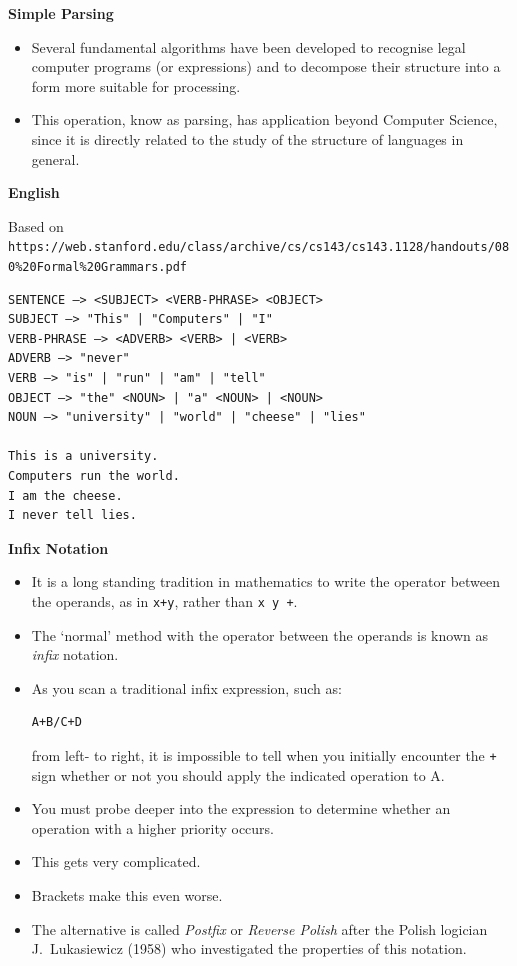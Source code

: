 \newpage
{\samepage
\begin{center}
{\Large{\bf Simple Parsing}}
\end{center}
\begin{itemize}
\item Several fundamental algorithms have been developed
to recognise legal computer programs (or expressions) and to
decompose their structure into a form more suitable for processing.
\item This operation, know as parsing, has application
beyond Computer Science, since it is directly related to the study of
the structure of languages in general.
\end{itemize}
}


\newpage
{\samepage
\begin{center}
{\Large{\bf English}}
\end{center}
{\small Based on \verb^https://web.stanford.edu/class/archive/cs/cs143/cs143.1128/handouts/080%20Formal%20Grammars.pdf^}
\begin{verbatim}
SENTENCE –> <SUBJECT> <VERB-PHRASE> <OBJECT>
SUBJECT –> "This" | "Computers" | "I"
VERB-PHRASE –> <ADVERB> <VERB> | <VERB>
ADVERB –> "never"
VERB –> "is" | "run" | "am" | "tell"
OBJECT –> "the" <NOUN> | "a" <NOUN> | <NOUN>
NOUN –> "university" | "world" | "cheese" | "lies"

This is a university.
Computers run the world.
I am the cheese.
I never tell lies.
\end{verbatim}
}

\newpage
{\samepage
\begin{center}
{\Large{\bf Infix Notation}}
\end{center}
{\small
\begin{itemize}
\item It is a long standing tradition in mathematics to write the operator
between the operands, as in \verb^x+y^, rather than \verb^x y +^.
\item The `normal' method with the operator between the operands is
known as {\it infix} notation.
\item As you scan a traditional infix expression, such as:
\begin{verbatim}
A+B/C+D
\end{verbatim}
from left- to right, it is impossible to tell when you initially encounter the \verb^+^ sign whether or not you should apply the indicated operation to
A.
\item You must probe deeper into the expression to determine whether an operation with a higher priority occurs.
\item This gets very complicated.
\item Brackets make this even worse.
\item The alternative is called {\it Postfix} or {\it Reverse Polish}
after the Polish logician J.\ Lukasiewicz (1958) who investigated the
properties of this notation.
\end{itemize}
}}

